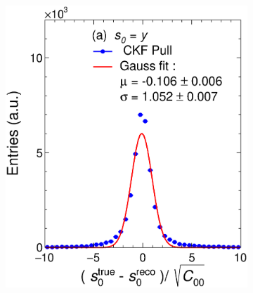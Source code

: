 \begin{figure}[t]
     \centering
     \begin{subfigure}{0.32\textwidth}
         \centering
         \includegraphics[width=\textwidth]{figures/ch5-KF_NDGAr/FullSample/Int/Units/Unit0.eps}
         \caption{}
         \label{fig:resp0KFGAr_Int}
     \end{subfigure}
     \begin{subfigure}{0.32\textwidth}
         \centering

\end{subfigure}
\end{figure}

